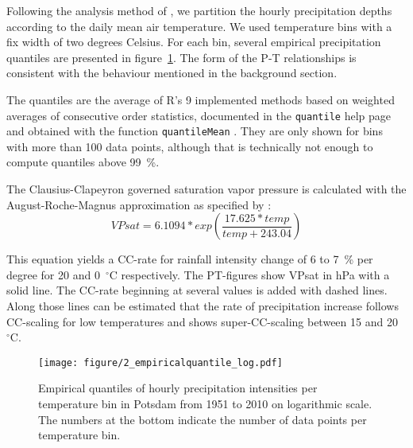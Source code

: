\documentclass[a4paper]{article}
\begin{document}
\begin{multicols}{2}

Following the analysis method of \citet{lenderink_increase_2008, berg_unexpected_2013}, we partition the hourly precipitation depths according to the daily mean air temperature.
We used temperature bins with a fix width of two degrees Celsius.
For each bin, several empirical precipitation quantiles are presented in figure~\ref{fig:equant}. The form of the P-T relationships is consistent with the behaviour mentioned in the background section.

The quantiles are the average of R's 9 implemented methods based on weighted averages of consecutive order statistics, documented in the \texttt{quantile} help page \citep{r_core_team_r:_2015-1} and obtained with the function \texttt{quantileMean} \citep{boessenkool_berryfunctions:_2014}.
They are only shown for bins with more than 100 data points, although that is technically not enough to compute quantiles above 99~\%. 

The Clausius-Clapeyron governed saturation vapor pressure is calculated with the August-Roche-Magnus approximation as specified by \citet{hardwick_jones_observed_2010}:
\begin{equation}
VPsat = 6.1094 * exp\left(\frac{17.625*temp}{temp+243.04}\right)
\end{equation}

This equation yields a CC-rate for rainfall intensity change of 6 to 7~\% per degree for 20 and 0~$^{\circ}$C respectively. 
The PT-figures show VPsat in hPa with a solid line.
The CC-rate beginning at several values is added with dashed lines.
Along those lines can be estimated that the rate of precipitation increase follows CC-scaling for low temperatures and shows super-CC-scaling between 15 and 20~$^{\circ}$C.

\begin{figure}[H] %
\texttt{[image: figure/2\_empiricalquantile\_log.pdf]}
\caption[Empirical quantiles]{Empirical quantiles of hourly precipitation intensities per temperature bin in Potsdam from 1951 to 2010 on logarithmic scale. The numbers at the bottom indicate the number of data points per temperature bin.}
\label{fig:equant}
\end{figure}

\end{multicols}
\end{document}
